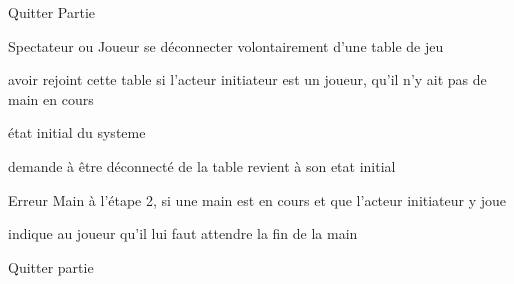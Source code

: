 

\begin{usecase}{Quitter Partie}
	
	\begin{presentation}
		\actor Spectateur ou Joueur
		\goal se déconnecter volontairement d'une table de jeu
		
		\begin{precondition}
			\condition avoir rejoint cette table
			\condition si l'acteur initiateur est un joueur, qu'il n'y ait pas 
			           de main en cours
		\end{precondition}
		
		\begin{postcondition}
			\condition état initial du systeme
		\end{postcondition}
		
		\begin{includeuc}
			\aucun
		\end{includeuc}
	\end{presentation}
	
	\begin{scenario}
		\start demande à être déconnecté de la table
			\system revient à son etat initial
	\end{scenario}
	
	\begin{alternative}
		\nomalt Erreur Main
			\condition à l'étape 2, si une main est en cours et que l'acteur 
			           initiateur y joue
			
		\begin{alt}
			\system indique au joueur qu'il lui faut attendre la fin de la main
		\end{alt}
	\end{alternative}
	
	                {Quitter partie}
	
\end{usecase}



